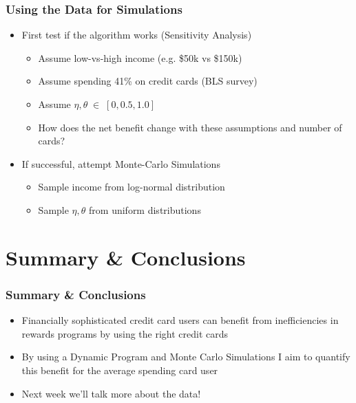 \begin{frame}
    \frametitle{Using the Data for Simulations}
    \begin{itemize}
        \item First test if the algorithm works (Sensitivity Analysis)
        \begin{itemize}
        \item Assume low-vs-high income (e.g. \$50k vs \$150k)
        \item Assume spending 41\% on credit cards (BLS survey)
        \item Assume $\eta, \theta \; \in \; [0, 0.5, 1.0]$
        \item How does the net benefit change with these assumptions and number of cards?
        \end{itemize}
    \end{itemize}
    \bigskip
    \begin{itemize}
        \item If successful, attempt Monte-Carlo Simulations
        \begin{itemize}
        \item Sample income from log-normal distribution
        \item Sample $\eta, \theta$ from uniform distributions
        \end{itemize}
    \end{itemize}
\end{frame}    

\section{Summary \& Conclusions}

\begin{frame}
    \frametitle{Summary \& Conclusions}
    \begin{itemize}
        \item Financially sophisticated credit card users can benefit from inefficiencies in rewards programs by using the right credit cards
        \bigskip
        \item By using a Dynamic Program and Monte Carlo Simulations I aim to quantify this benefit for the average spending card user\\
        \bigskip
        \item Next week we'll talk more about the data!
    \end{itemize}
\end{frame}

